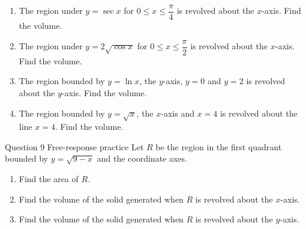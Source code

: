 \documentclass[11pt]{article}
\begin{document}
\begin{enumerate}[leftmargin=*,itemsep=2pt,start=5]
  \item The region under $y=\sec x$ for $0\le x\le\dfrac\pi4$ is revolved about the $x$-axis. Find the volume.\work{2.8cm}
  \item The region under $y=2\sqrt{\cos x}$ for $0\le x\le\dfrac\pi2$ is revolved about the $x$-axis. Find the volume.\work{2.8cm}
  \item The region bounded by $y=\ln x$, the $y$-axis, $y=0$ and $y=2$ is revolved about the $y$-axis. Find the volume.\work{2.8cm}
  \item The region bounded by $y=\sqrt{x}$, the $x$-axis and $x=4$ is revolved about the line $x=4$. Find the volume.\work{2.8cm}
\end{enumerate}

\begin{frbox}{Question 9 \textperiodcentered{} Free-response practice}
Let $R$ be the region in the first quadrant bounded by $y=\sqrt{9-x}$ and the coordinate axes.
\begin{enumerate}[label=(\alph*),leftmargin=*,itemsep=2pt]
  \item Find the area of $R$.\work{2.6cm}
  \item Find the volume of the solid generated when $R$ is revolved about the $x$-axis.\work{2.6cm}
  \item Find the volume of the solid generated when $R$ is revolved about the $y$-axis.\work{2.6cm}
\end{enumerate}
\end{frbox}
\end{document}
